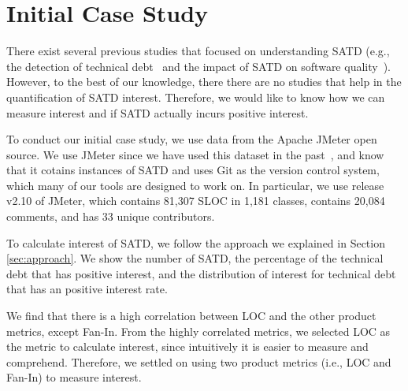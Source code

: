 
\section{Initial Case Study} \label{sec:results}
There exist several previous studies that focused on understanding SATD (e.g., the detection of technical debt~\cite{Potdar2014ICSME,Zazworka2013EASE} and the impact of SATD on software quality~\cite{Wehaibi2016SANER}). However, to the best of our knowledge, there there are no studies that help in the quantification of SATD interest. Therefore, we would like to know how we can measure interest and if SATD actually incurs positive interest.

To conduct our initial case study, we use data from the Apache JMeter open source. We use JMeter since we have used this dataset in the past~\cite{Maldonado2015MTD,Potdar2014ICSME}, and know that it cotains instances of SATD and uses Git as the version control system, which many of our tools are designed to work on. In particular, we use release v2.10 of JMeter, which contains 81,307 SLOC in 1,181 classes, contains 20,084 comments, and has 33 unique contributors.





To calculate interest of SATD, we follow the approach we explained in Section \ref{sec:approach}.
We show the number of SATD, the percentage of the technical debt that has positive interest, and the distribution of interest for technical debt that has an positive interest rate.

We find that there is a high correlation between LOC and the other product metrics, except Fan-In. From the highly correlated metrics, we selected LOC as the metric to calculate interest, since intuitively it is easier to measure and comprehend. Therefore, we settled on using two product metrics (i.e., LOC and Fan-In) to measure interest.

